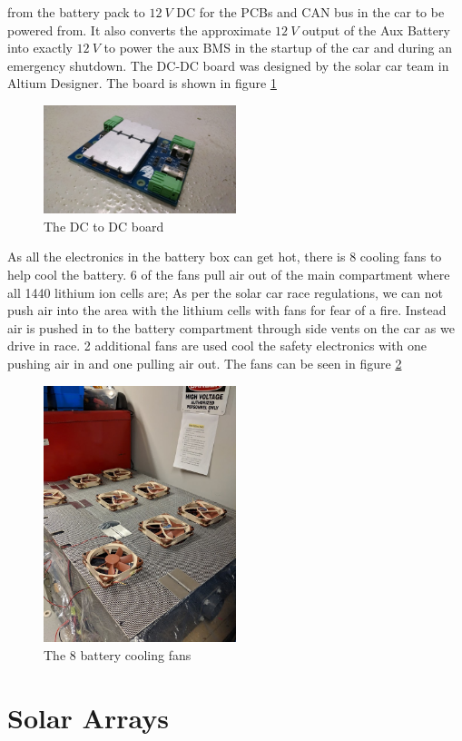 \documentclass[titlepage]{article}
\begin{document}
    from the battery pack to $12\ V$ DC for the PCBs and CAN bus in the
    car to be powered from. It also converts the approximate $12\ V$
    output of the Aux Battery into exactly $12\ V$ to power the aux BMS
    in the startup of the car and during an emergency shutdown. The
    DC-DC board was designed by the solar car team in Altium Designer.
    The board is shown in figure \ref{fig:DCDC}
    \begin{figure}[H]
        \centering
        \includegraphics[width=0.5\textwidth]{images/dc-dc_board.jpeg}
        \caption{The DC to DC board}
        \label{fig:DCDC}
    \end{figure}
    \par As all the electronics in the battery box can get hot, there is
    8 cooling fans to help cool the battery. 6 of the fans pull air out
    of the main compartment where all 1440 lithium ion cells are; As per
    the solar car race regulations, we can not push air into the area
    with the lithium cells with fans for fear of a fire. Instead air is
    pushed in to the battery compartment through side vents on the car
    as we drive in race. 2 additional fans are used cool the safety
    electronics with one pushing air in and one pulling air out. The
    fans can be seen in figure \ref{fig:fans}
    \begin{figure}[H]
        \centering
        \includegraphics[width=0.5\textwidth]{images/fans.jpg}
        \caption{The 8 battery cooling fans}
        \label{fig:fans}
    \end{figure}
    \section{Solar Arrays}
\end{document}
